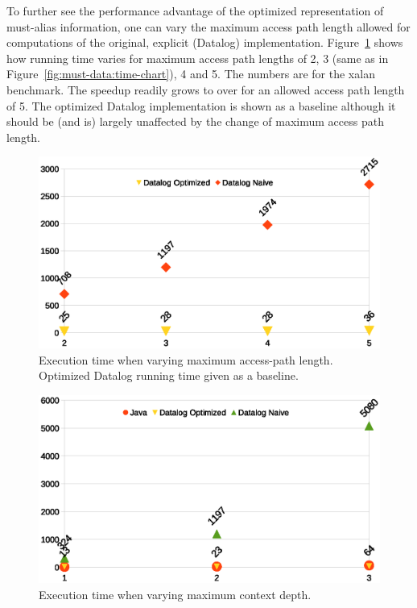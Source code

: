 To further see the performance advantage of the optimized representation of must-alias information, one can vary the maximum access path length allowed for computations of the original, explicit (Datalog) implementation. Figure~\ref{fig:must-data:aplength-chart} shows how running time varies for maximum access path lengths of 2, 3 (same as in Figure~\ref{fig:must-data:time-chart}), 4 and 5. The numbers are for the xalan benchmark. The speedup readily grows to over  for an allowed access path length of 5. The optimized Datalog implementation is shown as a baseline although it should be (and is) largely unaffected by the change of maximum access path length.

\begin{figure}[htp]
\centering
\includegraphics[clip,width=\linewidth]{assets/must-data/length.eps}
\caption[Execution times when varying max access-path length]{Execution time when varying maximum access-path length. Optimized Datalog running time given as a baseline.}
\label{fig:must-data:aplength-chart}
\end{figure}



\begin{figure}[h!tp]
\centering
\includegraphics[clip,width=\linewidth]{assets/must-data/depth.eps}
\caption[Execution times when varying max context depth]{Execution time when varying maximum context depth.}
\label{fig:must-data:ctxdepth-chart}
\end{figure}

